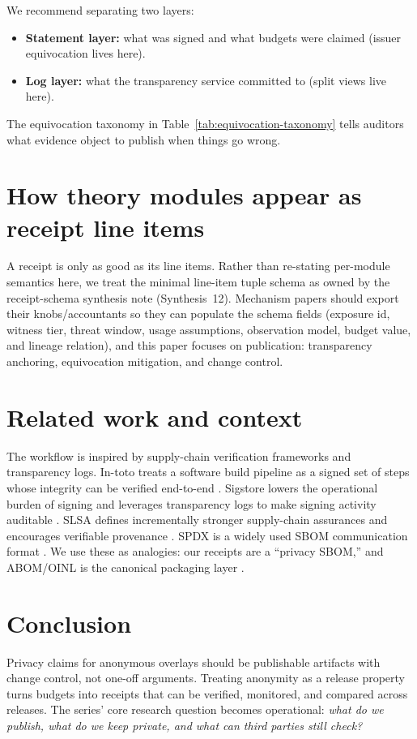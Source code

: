 \documentclass[11pt]{article}
\begin{document}
We recommend separating two layers:
\begin{itemize}[leftmargin=1.2em]
\item \textbf{Statement layer:} what was signed and what budgets were claimed (issuer equivocation lives here).
\item \textbf{Log layer:} what the transparency service committed to (split views live here).
\end{itemize}
The equivocation taxonomy in Table~\ref{tab:equivocation-taxonomy} tells auditors what evidence object to publish when things go wrong.

\section{How theory modules appear as receipt line items}
A receipt is only as good as its line items.
Rather than re-stating per-module semantics here, we treat the minimal line-item tuple schema as owned by the receipt-schema synthesis note (Synthesis~12).\cite{series:receiptitems}
Mechanism papers should export their knobs/accountants so they can populate the schema fields (exposure id, witness tier, threat window, usage assumptions, observation model, budget value, and lineage relation), and this paper focuses on publication: transparency anchoring, equivocation mitigation, and change control.

\section{Related work and context}
The workflow is inspired by supply-chain verification frameworks and transparency logs.
In-toto treats a software build pipeline as a signed set of steps whose integrity can be verified end-to-end \cite{torresarias_intoto_sec19}.
Sigstore lowers the operational burden of signing and leverages transparency logs to make signing activity auditable \cite{sigstore_ccs2022}.
SLSA defines incrementally stronger supply-chain assurances and encourages verifiable provenance \cite{slsa_v1}.
SPDX is a widely used SBOM communication format \cite{spdx_301}.
We use these as analogies: our receipts are a ``privacy SBOM,'' and ABOM/OINL is the canonical packaging layer \cite{series:abom}.

\section{Conclusion}
Privacy claims for anonymous overlays should be publishable artifacts with change control, not one-off arguments.
Treating anonymity as a release property turns budgets into receipts that can be verified, monitored, and compared across releases.
The series' core research question becomes operational: \emph{what do we publish, what do we keep private, and what can third parties still check?}
\end{document}
